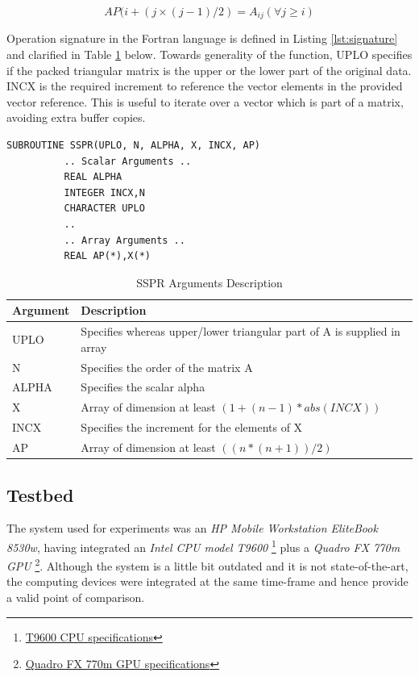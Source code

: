 \documentclass{llncs}
\begin{document}
\begin{equation}
AP(i + ( j \times (j-1) / 2) = A _{ij} (\forall j \geq i)
\label{eq:packed}
\end{equation}

Operation signature in the Fortran language is defined in Listing \ref{lst:signature} and clarified in Table \ref{table:args} below. Towards generality of the function, UPLO specifies if the packed triangular matrix is the upper or the lower part of the original data. INCX is the required increment to reference the vector elements in the provided vector reference. This is useful to iterate over a vector which is part of a matrix, avoiding extra buffer copies.

\begin{lstlisting}[language=FORTRAN, caption={SSPR Fortran Signature}, label={lst:signature}]
SUBROUTINE SSPR(UPLO, N, ALPHA, X, INCX, AP)
          .. Scalar Arguments ..
          REAL ALPHA
          INTEGER INCX,N
          CHARACTER UPLO
          ..
          .. Array Arguments ..
          REAL AP(*),X(*)
\end{lstlisting}

\begin{table}
\caption{SSPR Arguments Description}
\centering
\begin{tabular} {|l|l|} \hline
{\bf Argument} & {\bf Description} \\ \hline
UPLO & Specifies whereas upper/lower triangular part of A is supplied in array \\ \hline
N & Specifies the order of the matrix A \\ \hline
ALPHA & Specifies the scalar alpha \\ \hline
X & Array of dimension at least $ ( 1 + ( n - 1 ) * abs( INCX ) ) $ \\ \hline
INCX & Specifies the increment for the elements of X \\ \hline
AP & Array of dimension at least $ ( ( n*( n + 1 ) ) / 2 ) $ \\ \hline
\end{tabular}
\label{table:args}
\end{table}

\subsection{Testbed}

The system used for experiments was an {\it HP Mobile Workstation EliteBook 8530w}, having integrated
an {\it Intel CPU model T9600} \footnote{\href{http://ark.intel.com/products/35563}{T9600 CPU specifications}}
plus a {\it Quadro FX 770m GPU} \footnote{\href{http://www.nvidia.com/docs/IO/57883/PO\_Quadro\_FAM\_Mar08\_FINAL\_LowRes.pdf}{Quadro FX 770m GPU specifications}}. Although the system is a little bit outdated and it is not state-of-the-art, the computing devices were integrated at the same time-frame and hence provide a valid point of comparison.
\end{document}
